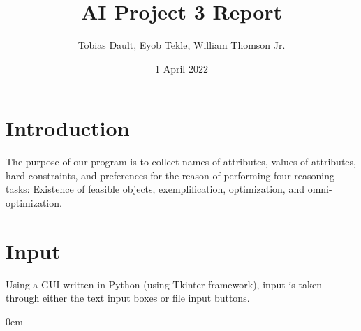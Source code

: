 \documentclass[titlepage]{article}
\title{\textbf{AI Project 3 Report}}
\author{Tobias Dault, Eyob Tekle, William Thomson Jr.}
\date{1 April 2022}
\begin{document}
\maketitle
\tableofcontents
\newpage
\thispagestyle{empty}

\section{Introduction}
The purpose of our program is to collect names of attributes, values of attributes, hard constraints, and preferences for the reason of performing four reasoning tasks: Existence of feasible objects, exemplification, optimization, and omni-optimization.
\newpage

\section{Input}
Using a GUI written in Python (using Tkinter framework), input is taken through either the text input boxes or file input buttons.

\addtolength{\itemindent}{0.80cm}
\itemsep0em
\end{document}
